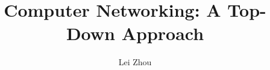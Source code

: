 \documentclass{article}
\begin{document}
\title{Computer Networking: A Top-Down Approach}
\author{Lei Zhou}
\maketitle


















\end{document}
